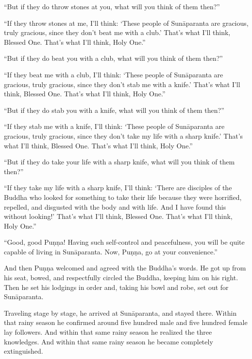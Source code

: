 \documentclass[12pt,openany]{book}%
\begin{document}
“But if they do throw stones at you, what will you think of them then?” 

“If they throw stones at me, I’ll think: ‘These people of \textsanskrit{Sunāparanta} are gracious, truly gracious, since they don’t beat me with a club.’ That’s what I’ll think, Blessed One. That’s what I’ll think, Holy One.” 

“But if they do beat you with a club, what will you think of them then?” 

“If they beat me with a club, I’ll think: ‘These people of \textsanskrit{Sunāparanta} are gracious, truly gracious, since they don’t stab me with a knife.’ That’s what I’ll think, Blessed One. That’s what I’ll think, Holy One.” 

“But if they do stab you with a knife, what will you think of them then?” 

“If they stab me with a knife, I’ll think: ‘These people of \textsanskrit{Sunāparanta} are gracious, truly gracious, since they don’t take my life with a sharp knife.’ That’s what I’ll think, Blessed One. That’s what I’ll think, Holy One.” 

“But if they do take your life with a sharp knife, what will you think of them then?” 

“If they take my life with a sharp knife, I’ll think: ‘There are disciples of the Buddha who looked for something to take their life because they were horrified, repelled, and disgusted with the body and with life. And I have found this without looking!’ That’s what I’ll think, Blessed One. That’s what I’ll think, Holy One.” 

“Good, good \textsanskrit{Puṇṇa}! Having such self-control and peacefulness, you will be quite capable of living in \textsanskrit{Sunāparanta}. Now, \textsanskrit{Puṇṇa}, go at your convenience.” 

And then \textsanskrit{Puṇṇa} welcomed and agreed with the Buddha’s words. He got up from his seat, bowed, and respectfully circled the Buddha, keeping him on his right. Then he set his lodgings in order and, taking his bowl and robe, set out for \textsanskrit{Sunāparanta}. 

Traveling stage by stage, he arrived at \textsanskrit{Sunāparanta}, and stayed there. Within that rainy season he confirmed around five hundred male and five hundred female lay followers. And within that same rainy season he realized the three knowledges. And within that same rainy season he became completely extinguished. 
\end{document}
